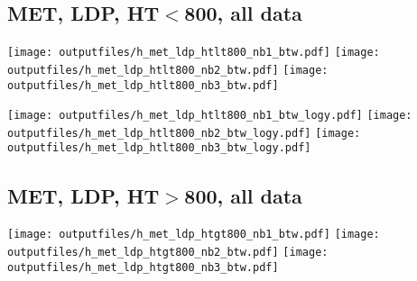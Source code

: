 \documentclass[11pt]{article}
\begin{document}






    \subsection{ MET, LDP, HT$<$800, all data}

    \noindent
     \texttt{[image: outputfiles/h\_met\_ldp\_htlt800\_nb1\_btw.pdf]}
     \texttt{[image: outputfiles/h\_met\_ldp\_htlt800\_nb2\_btw.pdf]}
     \texttt{[image: outputfiles/h\_met\_ldp\_htlt800\_nb3\_btw.pdf]}

    \noindent
     \texttt{[image: outputfiles/h\_met\_ldp\_htlt800\_nb1\_btw\_logy.pdf]}
     \texttt{[image: outputfiles/h\_met\_ldp\_htlt800\_nb2\_btw\_logy.pdf]}
     \texttt{[image: outputfiles/h\_met\_ldp\_htlt800\_nb3\_btw\_logy.pdf]}


    \subsection{ MET, LDP, HT$>$800, all data}

    \noindent
     \texttt{[image: outputfiles/h\_met\_ldp\_htgt800\_nb1\_btw.pdf]}
     \texttt{[image: outputfiles/h\_met\_ldp\_htgt800\_nb2\_btw.pdf]}
     \texttt{[image: outputfiles/h\_met\_ldp\_htgt800\_nb3\_btw.pdf]}
\end{document}
